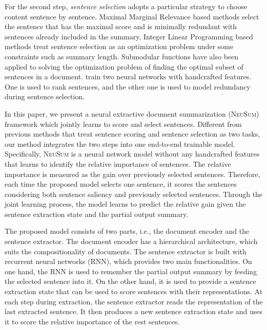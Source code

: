 \documentclass[11pt,a4paper]{article}
\newcommand{\ourModelName}{\textsc{NeuSum}}
\begin{document}
For the second step, \textit{sentence selection} adopts a particular strategy to choose content sentence by sentence.
Maximal Marginal Relevance  \cite{carbonell1998use} based methods select the sentence that has the maximal score and is minimally redundant with sentences already included in the summary.
Integer Linear Programming based methods \cite{mcdonald2007study} treat sentence selection as an optimization problem under some constraints such as summary length.
Submodular functions \cite{lin2011class} have also been applied to solving the optimization problem of finding the optimal subset of sentences in a document.
\citet{ren2016redundancy} train two neural networks with handcrafted features. One is used to rank  sentences, and the other one is used to model  redundancy during sentence selection.



In this paper, we present a neural extractive document summarization (\ourModelName{}) framework which jointly learns to score and select sentences.
Different from previous methods that treat sentence scoring and sentence selection as two tasks, our method integrates the two steps into one end-to-end trainable model.
Specifically, \ourModelName{} is a neural network model without any handcrafted features that learns to identify the relative importance of sentences.
The relative importance is measured as the gain over previously selected sentences.
Therefore, each time the proposed model selects one sentence, it scores the sentences considering both  sentence saliency and previously selected sentences.
Through the joint learning process, the model learns to predict the relative gain given the sentence extraction state and the partial output summary.

The proposed model consists of two parts, i.e., the document encoder and the sentence extractor.
The document encoder has a hierarchical architecture, which suits the compositionality of documents.
The sentence extractor is built with recurrent neural networks (RNN), which provides two main functionalities.
On one hand, the RNN is used to remember the partial output summary by feeding the selected sentence into it.
On the other hand, it is used to provide a sentence extraction state that can be used to score sentences with their representations.
At each  step during extraction, the sentence extractor reads the representation of the last extracted sentence.
It then produces a new sentence extraction state and uses it to score the relative importance of the rest sentences.
\end{document}
